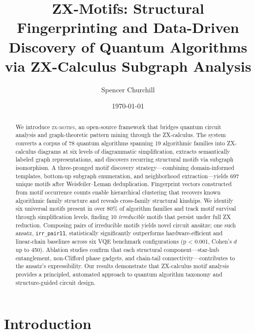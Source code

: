 \documentclass[twocolumn,prl,amsmath,amssymb,superscriptaddress]{revtex4-2}
\newcommand{\zxmotifs}{\textsc{zx-motifs}}
\begin{document}
\title{ZX-Motifs: Structural Fingerprinting and Data-Driven Discovery of Quantum Algorithms via ZX-Calculus Subgraph Analysis}

\author{Spencer Churchill}

\date{\today}

\begin{abstract}
We introduce \zxmotifs{}, an open-source framework that bridges quantum circuit analysis and graph-theoretic pattern mining through the ZX-calculus.
The system converts a corpus of 78 quantum algorithms spanning 19 algorithmic families into ZX-calculus diagrams at six levels of diagrammatic simplification, extracts semantically labeled graph representations, and discovers recurring structural motifs via subgraph isomorphism.
A three-pronged motif discovery strategy---combining domain-informed templates, bottom-up subgraph enumeration, and neighborhood extraction---yields 697 unique motifs after Weisfeiler--Leman deduplication.
Fingerprint vectors constructed from motif occurrence counts enable hierarchical clustering that recovers known algorithmic family structure and reveals cross-family structural kinships.
We identify six universal motifs present in over 80\% of algorithm families and track motif survival through simplification levels, finding 10 \emph{irreducible} motifs that persist under full ZX reduction.
Composing pairs of irreducible motifs yields novel circuit ansätze; one such ansatz, \texttt{irr\_pair11}, statistically significantly outperforms hardware-efficient and linear-chain baselines across six VQE benchmark configurations (p < 0.001, Cohen's $d$ up to 450).
Ablation studies confirm that each structural component---star-hub entanglement, non-Clifford phase gadgets, and chain-tail connectivity---contributes to the ansatz's expressibility.
Our results demonstrate that ZX-calculus motif analysis provides a principled, automated approach to quantum algorithm taxonomy and structure-guided circuit design.
\end{abstract}

\maketitle

\section{Introduction}
\label{sec:introduction}
\end{document}
